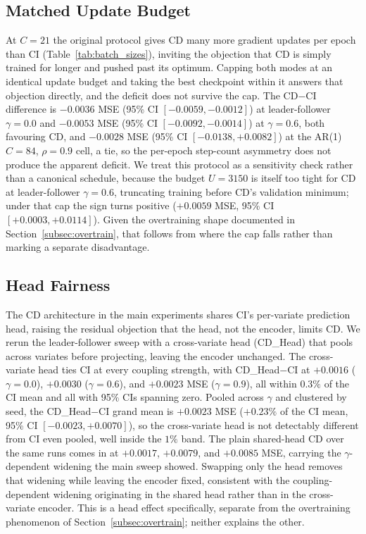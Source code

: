 \documentclass[10pt]{article} %
\begin{document}
    \subsection{Matched Update Budget}
    \label{subsec:equalcompute}

    At $C = 21$ the original protocol gives CD many more gradient updates per epoch than CI (Table~\ref{tab:batch_sizes}),
    inviting the objection that CD is simply trained for longer and pushed past its optimum. Capping both modes at an
    identical update budget and taking the best checkpoint within it answers that objection directly, and the deficit
    does not survive the cap. The CD$-$CI difference is $-0.0036$ MSE (95\% CI $[-0.0059, -0.0012]$) at leader-follower
    $\gamma = 0.0$ and $-0.0053$ MSE (95\% CI $[-0.0092, -0.0014]$) at $\gamma = 0.6$, both favouring CD, and $-0.0028$
    MSE (95\% CI $[-0.0138, +0.0082]$) at the AR(1) $C = 84$, $\rho = 0.9$ cell, a tie, so the per-epoch step-count asymmetry
    does not produce the apparent deficit. We treat this protocol as a sensitivity check rather than a canonical schedule,
    because the budget $U = 3150$ is itself too tight for CD at leader-follower $\gamma = 0.6$, truncating training before
    CD's validation minimum; under that cap the sign turns positive ($+0.0059$ MSE, 95\% CI $[+0.0003, +0.0114]$). Given the
    overtraining shape documented in Section~\ref{subsec:overtrain}, that follows from where the cap falls rather than marking
    a separate disadvantage.

    \subsection{Head Fairness}
    \label{subsec:cdhead}

    The CD architecture in the main experiments shares CI's per-variate prediction head, raising the residual objection
    that the head, not the encoder, limits CD. We rerun the leader-follower sweep with a cross-variate head (CD\_Head) that
    pools across variates before projecting, leaving the encoder unchanged. The cross-variate head ties CI at every coupling
    strength, with CD\_Head$-$CI at $+0.0016$ ($\gamma = 0.0$), $+0.0030$ ($\gamma = 0.6$), and $+0.0023$ MSE ($\gamma = 0.9$),
    all within $0.3\%$ of the CI mean and all with 95\% CIs spanning zero. Pooled across $\gamma$ and clustered by seed, the
    CD\_Head$-$CI grand mean is $+0.0023$ MSE ($+0.23\%$ of the CI mean, 95\% CI $[-0.0023, +0.0070]$), so the cross-variate
    head is not detectably different from CI even pooled, well inside the $1\%$ band. The plain shared-head CD over the same
    runs comes in at $+0.0017$, $+0.0079$, and $+0.0085$ MSE, carrying the $\gamma$-dependent widening the main sweep showed.
    Swapping only the head removes that widening while leaving the encoder fixed, consistent with the coupling-dependent widening
    originating in the shared head rather than in the cross-variate encoder. This is a head effect specifically, separate from the
    overtraining phenomenon of Section~\ref{subsec:overtrain}; neither explains the other.
\end{document}
